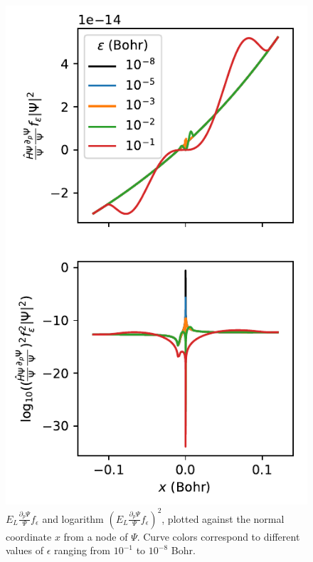 \documentclass[twocolumn]{revtex4-1}
\begin{document}
\begin{figure}
\includegraphics[width=1.0\columnwidth]{../2_plots/viznode.pdf}
\caption{$E_L\frac{\partial_p \Psi}{\Psi} f_\epsilon$ and logarithm $(E_L\frac{\partial_p \Psi}{\Psi} f_\epsilon)^2$, plotted against the normal coordinate $x$ from a node of $\Psi$. Curve colors correspond to different values of $\epsilon$ ranging from $10^{-1}$ to $10^{-8}$ Bohr.}
\end{figure}
\end{document}
